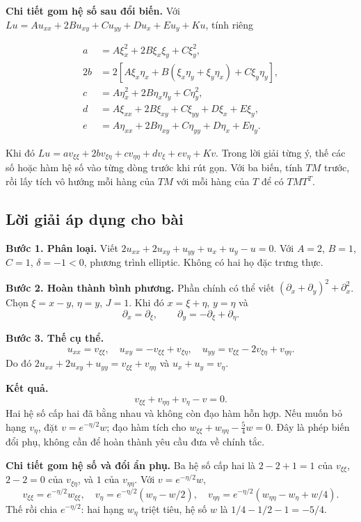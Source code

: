 \documentclass[10pt,a4paper]{article}
\begin{document}
\textbf{Chi tiết gom hệ số sau đổi biến.} Với $Lu=Au_{xx}+2Bu_{xy}+Cu_{yy}+Du_x+Eu_y+Ku$, tính riêng


\[
\begin{aligned}
a&=A\xi_x^2+2B\xi_x\xi_y+C\xi_y^2,\\
2b&=2[A\xi_x\eta_x+B(\xi_x\eta_y+\xi_y\eta_x)+C\xi_y\eta_y],\\
c&=A\eta_x^2+2B\eta_x\eta_y+C\eta_y^2,\\
d&=A\xi_{xx}+2B\xi_{xy}+C\xi_{yy}+D\xi_x+E\xi_y,\\
e&=A\eta_{xx}+2B\eta_{xy}+C\eta_{yy}+D\eta_x+E\eta_y.
\end{aligned}
\]


Khi đó $Lu=av_{\xi\xi}+2bv_{\xi\eta}+cv_{\eta\eta}+dv_\xi+ev_\eta+Kv$. Trong lời giải từng ý, thế các số hoặc hàm hệ số vào từng dòng trước khi rút gọn. Với ba biến, tính $TM$ trước, rồi lấy tích vô hướng mỗi hàng của $TM$ với mỗi hàng của $T$ để có $TMT^T$.
\subsection*{Lời giải áp dụng cho bài}
\textbf{Bước 1. Phân loại.} Viết $2u_{xx}+2u_{xy}+u_{yy}+u_x+u_y-u=0$. Với $A=2$, $B=1$, $C=1$, $\delta=-1<0$, phương trình elliptic. Không có hai họ đặc trưng thực.

\textbf{Bước 2. Hoàn thành bình phương.} Phần chính có thể viết $(\partial_x+\partial_y)^2+\partial_x^2$. Chọn $\xi=x-y$, $\eta=y$, $J=1$. Khi đó $x=\xi+\eta$, $y=\eta$ và
\[\partial_x=\partial_\xi,\qquad\partial_y=-\partial_\xi+\partial_\eta.\]

\textbf{Bước 3. Thế cụ thể.}
\[u_{xx}=v_{\xi\xi},\quad u_{xy}=-v_{\xi\xi}+v_{\xi\eta},\quad
u_{yy}=v_{\xi\xi}-2v_{\xi\eta}+v_{\eta\eta}.\]
Do đó $2u_{xx}+2u_{xy}+u_{yy}=v_{\xi\xi}+v_{\eta\eta}$ và $u_x+u_y=v_\eta$.

\textbf{Kết quả.}
\[\boxed{v_{\xi\xi}+v_{\eta\eta}+v_\eta-v=0.}\]
Hai hệ số cấp hai đã bằng nhau và không còn đạo hàm hỗn hợp. Nếu muốn bỏ hạng $v_\eta$, đặt $v=e^{-\eta/2}w$; đạo hàm tích cho $w_{\xi\xi}+w_{\eta\eta}-\tfrac54w=0$. Đây là phép biến đổi phụ, không cần để hoàn thành yêu cầu đưa về chính tắc.

\textbf{Chi tiết gom hệ số và đổi ẩn phụ.} Ba hệ số cấp hai là $2-2+1=1$ của $v_{\xi\xi}$, $2-2=0$ của $v_{\xi\eta}$, và $1$ của $v_{\eta\eta}$. Với $v=e^{-\eta/2}w$,
\[v_{\xi\xi}=e^{-\eta/2}w_{\xi\xi},\quad v_\eta=e^{-\eta/2}(w_\eta-w/2),\quad
v_{\eta\eta}=e^{-\eta/2}(w_{\eta\eta}-w_\eta+w/4).\]
Thế rồi chia $e^{-\eta/2}$: hai hạng $w_\eta$ triệt tiêu, hệ số $w$ là $1/4-1/2-1=-5/4$.
\end{document}
